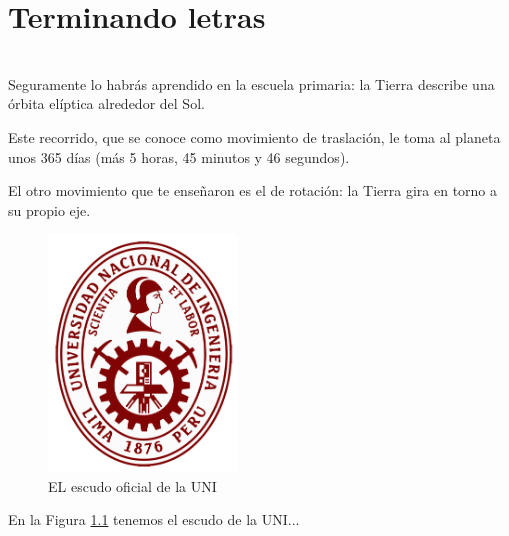 \documentclass{report}
\begin{document}
	
	
	
	
	
	
	
\addtocounter{chapter}{4}	
	
	
\chapter{Terminando letras}
\setcounter{page}{90}
	
	\listoftables
	
	\ \\[2cm]

Seguramente lo habrás aprendido en la escuela primaria: la Tierra describe una órbita elíptica alrededor del Sol.

Este recorrido, que se conoce como movimiento de traslación, le toma al planeta unos 365 días 
(más 5 horas, 45 minutos y 46 segundos).

El otro movimiento que te enseñaron es el de rotación: la Tierra gira en torno a su propio eje.

\begin{figure}[H]
\centering
\includegraphics[width=5cm]{uni}
\caption{EL escudo oficial de la UNI}\label{fig1}
\end{figure}

En la Figura \ref{fig1} tenemos el escudo de la UNI...
\end{document}
